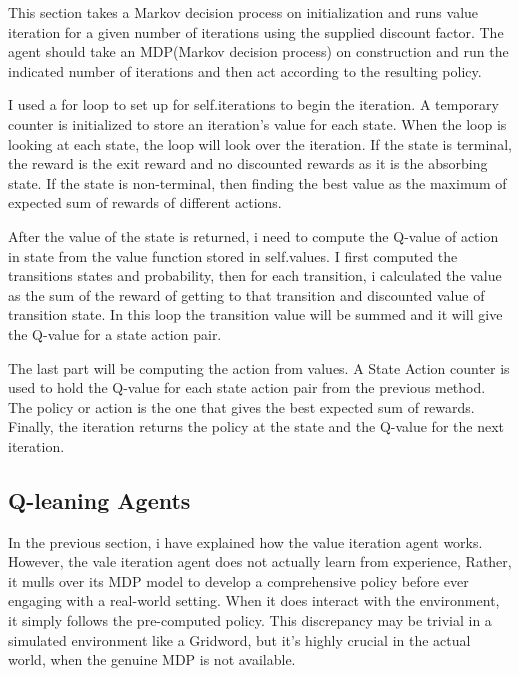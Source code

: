 \documentclass[10pt,twocolumn]{article}
\begin{document}
    This section takes a Markov decision process on initialization and runs value iteration for a given number of iterations using the supplied discount factor. The agent should take an MDP(Markov decision process) on construction and run the indicated number of iterations and then act according to the resulting policy. 
    
    I used a for loop to set up for self.iterations to begin the iteration. A temporary counter is initialized to store an iteration's value for each state. When the loop is looking at each state, the loop will look over the iteration. If the state is terminal, the reward is the exit reward and no discounted rewards as it is the absorbing state. If the state is non-terminal, then finding the best value as the maximum of expected sum of rewards of different actions.
    
    After the value of the state is returned, i need to compute the Q-value of action in state from the value function stored in self.values. I first computed the transitions states and probability, then for each transition, i calculated the value as the sum of the reward of getting to that transition and discounted value of transition state. In this loop the transition value will be summed and it will give the Q-value for a state action pair. 
    
    The last part will be computing the action from values. A State Action counter is used to hold the Q-value for each state action pair from the previous method. The policy or action is the one that gives the best expected sum of rewards. Finally, the iteration returns the policy at the state and the Q-value for the next iteration.
    
\subsection{Q-leaning Agents}
    In the previous section, i have explained how the value iteration agent works. However, the vale iteration agent does not actually learn from experience, Rather, it mulls over its MDP model to develop a comprehensive policy before ever engaging with a real-world setting. When it does interact with the environment, it simply follows the pre-computed policy. This discrepancy may be trivial in a simulated environment like a Gridword, but it's highly crucial in the actual world, when the genuine MDP is not available. 
    
\end{document}
